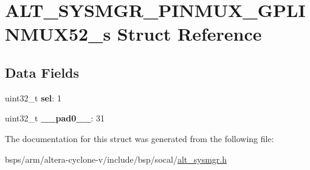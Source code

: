\hypertarget{structALT__SYSMGR__PINMUX__GPLINMUX52__s}{}\section{A\+L\+T\+\_\+\+S\+Y\+S\+M\+G\+R\+\_\+\+P\+I\+N\+M\+U\+X\+\_\+\+G\+P\+L\+I\+N\+M\+U\+X52\+\_\+s Struct Reference}
\label{structALT__SYSMGR__PINMUX__GPLINMUX52__s}
\subsection*{Data Fields}
\begin{DoxyCompactItemize}
\item 
\mbox{\label{structALT__SYSMGR__PINMUX__GPLINMUX52__s_a3d5019dcde36e6ae46b55551c00b576d}} 
uint32\+\_\+t {\bfseries sel}\+: 1
\item 
\mbox{\label{structALT__SYSMGR__PINMUX__GPLINMUX52__s_a674e9b1ef964d87fbc9d5d45d8465dea}} 
uint32\+\_\+t {\bfseries \+\_\+\+\_\+pad0\+\_\+\+\_\+}\+: 31
\end{DoxyCompactItemize}


The documentation for this struct was generated from the following file\+:\begin{DoxyCompactItemize}
\item 
bsps/arm/altera-\/cyclone-\/v/include/bsp/socal/\mbox{\hyperlink{alt__sysmgr_8h}{alt\+\_\+sysmgr.\+h}}\end{DoxyCompactItemize}
